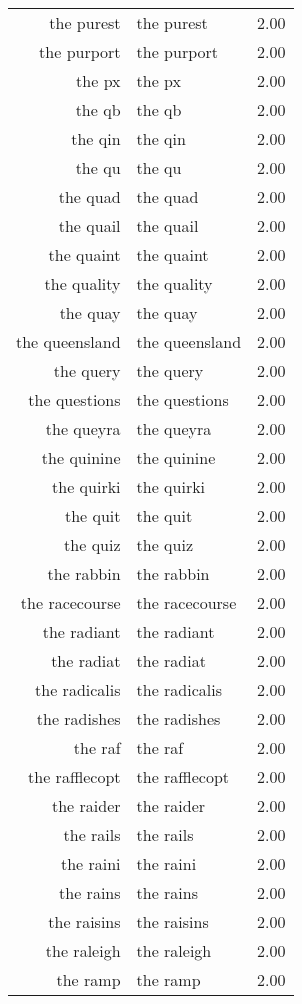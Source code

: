 \begin{table}[ht]
\begin{tabular}{rlr}
  the purest & the purest & 2.00 \\ 
  the purport & the purport & 2.00 \\ 
  the px & the px & 2.00 \\ 
  the qb & the qb & 2.00 \\ 
  the qin & the qin & 2.00 \\ 
  the qu & the qu & 2.00 \\ 
  the quad & the quad & 2.00 \\ 
  the quail & the quail & 2.00 \\ 
  the quaint & the quaint & 2.00 \\ 
  the quality & the quality & 2.00 \\ 
  the quay & the quay & 2.00 \\ 
  the queensland & the queensland & 2.00 \\ 
  the query & the query & 2.00 \\ 
  the questions & the questions & 2.00 \\ 
  the queyra & the queyra & 2.00 \\ 
  the quinine & the quinine & 2.00 \\ 
  the quirki & the quirki & 2.00 \\ 
  the quit & the quit & 2.00 \\ 
  the quiz & the quiz & 2.00 \\ 
  the rabbin & the rabbin & 2.00 \\ 
  the racecourse & the racecourse & 2.00 \\ 
  the radiant & the radiant & 2.00 \\ 
  the radiat & the radiat & 2.00 \\ 
  the radicalis & the radicalis & 2.00 \\ 
  the radishes & the radishes & 2.00 \\ 
  the raf & the raf & 2.00 \\ 
  the rafflecopt & the rafflecopt & 2.00 \\ 
  the raider & the raider & 2.00 \\ 
  the rails & the rails & 2.00 \\ 
  the raini & the raini & 2.00 \\ 
  the rains & the rains & 2.00 \\ 
  the raisins & the raisins & 2.00 \\ 
  the raleigh & the raleigh & 2.00 \\ 
  the ramp & the ramp & 2.00 \\ 

\end{tabular}
\end{table}
